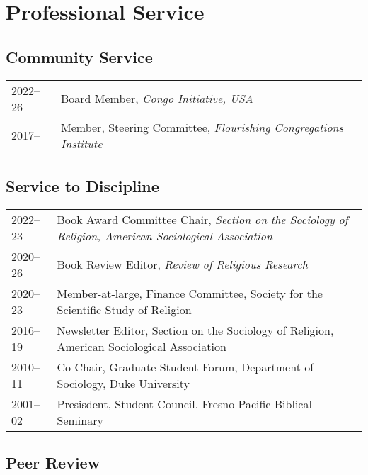 \section*{Professional Service}
\newcommand{\tabitem}{~~\llap{\textbullet}~~}
\subsection*{Community Service}
\begin{tabular}{p{} p{}}
2022--26 & Board Member, \textit{Congo Initiative, USA}\\
2017-- & Member, Steering Committee, \textit{Flourishing Congregations Institute}\\
\end{tabular}

\subsection*{Service to Discipline}

\begin{tabular}{p{} p{}}
2022--23 & Book Award Committee Chair, \textit{Section on the Sociology of Religion, American Sociological Association}\\
2020--26 & Book Review Editor, \textit{Review of Religious Research}\\
2020--23 & Member-at-large, Finance Committee, Society for the Scientific Study of Religion\\
2016--19 & Newsletter Editor, Section on the Sociology of Religion, American Sociological Association\\
2010--11 & Co-Chair, Graduate Student Forum, Department of Sociology, Duke University\\
2001--02 & Presisdent, Student Council, Fresno Pacific Biblical Seminary\\
\end{tabular}

\subsection*{Peer Review}

